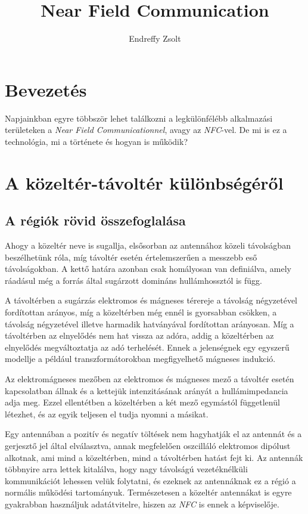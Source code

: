 \documentclass[french,12pt]{article}
\author{Endreffy Zsolt}
\title{Near Field Communication}
\begin{document}
\maketitle

\pagebreak

\tableofcontents

\pagebreak

\section{Bevezetés}
Napjainkban egyre többször lehet találkozni a legkülönfélébb alkalmazási 
területeken a \textit{Near Field Communicationnel}, avagy az \textit{NFC}-vel.
De mi is ez a technológia, mi a története és hogyan is működik?

\section{A közeltér-távoltér különbségéről}

\subsection{A régiók rövid összefoglalása}
Ahogy a közeltér neve is sugallja, elsősorban az antennához közeli távolságban
beszélhetünk róla, míg távoltér esetén értelemszerűen a messzebb eső 
távolságokban. A kettő határa azonban csak homályosan van definiálva, amely
ráadásul még a forrás által sugárzott domináns hullámhossztól is függ.

A távoltérben a sugárzás elektromos és mágneses térereje a 
távolság négyzetével fordítottan arányos, 
míg a közeltérben még ennél is gyorsabban csökken, a távolság négyzetével illetve 
harmadik hatványával fordítottan arányosan.
Míg a távoltérben az elnyelődés nem hat vissza az adóra, addig a közeltérben az 
elnyelődés megváltoztatja az adó terhelését. Ennek a jelenségnek egy egyszerű
modellje a például transzformátorokban megfigyelhető mágneses indukció.

Az elektromágneses mezőben az elektromos és mágneses mező a távoltér esetén kapcsolatban
állnak és a kettejük intenzitásának arányát a hullámimpedancia adja meg. 
Ezzel ellentétben a közeltérben a két mező egymástól függetlenül létezhet, és
az egyik teljesen el tudja nyomni a másikat.

Egy antennában a pozitív és negatív töltések nem hagyhatják el az antennát és a 
gerjesztő jel által elválasztva, annak megfelelően oszcilláló elektromos dipólust
alkotnak, ami mind a közeltérben, mind a távoltérben hatást fejt ki. Az antennák
többnyire arra lettek kitalálva, hogy nagy távolságú vezetéknélküli kommunikációt
lehessen velük folytatni, és ezeknek az antennáknak ez a régió a normális működési
tartományuk. Természetesen a közeltér antennákat is egyre gyakrabban használjuk
adatátvitelre, hiszen az \textit{NFC} is ennek a képviselője.
\end{document}
